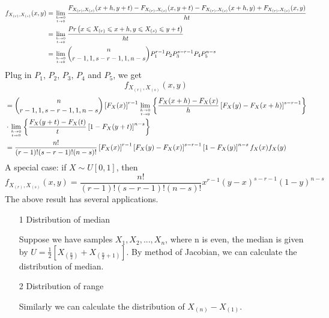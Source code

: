 \documentclass[twoside]{article}
\begin{document}
	\begin{align*}
		f_{X_{(r)}, X_{(s)}}(x,y) &= \lim\limits_{h\to 0 \atop t\to 0} \frac{F_{X_{(r)}, X_{(s)}}(x+h, y+t) - F_{X_{(r)}, X_{(s)}}(x, y+t) - F_{X_{(r)}, X_{(s)}}(x+h, y) + F_{X_{(r)}, X_{(s)}}(x, y)}{ht} \\
		&= \lim\limits_{h\to 0 \atop t\to 0} \frac{Pr \left( x \leqslant X_{(r)} \leqslant x+h, y \leqslant X_{(s)} \leqslant y+t \right)}{ht} \\
		&= \lim\limits_{h\to 0 \atop t\to 0} \binom{n}{r-1, 1, s-r-1, 1, n-s} P_1^{r-1} P_2 P_3^{s-r-1} P_4 P_5^{n-s}
	\end{align*}
	Plug in $P_1$, $P_2$, $P_3$, $P_4$ and $P_5$, we get
	$$
	f_{X_{(r)}, X_{(s)}} (x,y)
	$$
	\begin{align*}
		&= \binom{n}{r-1, 1, s-r-1, 1, n-s} \left[ F_X (x) \right]^{r-1} \lim\limits_{h\to 0 \atop t\to 0} \left\{ \frac{F_X(x+h) - F_X(x)}{h} \left[ F_X(y) - F_X(x+h) \right]^{s-r-1} \right\} \\
		&\cdot \lim\limits_{h\to 0 \atop t\to 0} \left\{ \frac{F_X(y+t) - F_X(t)}{t} \left[ 1 - F_X (y+t) \right]^{n-s} \right\} \\
		&= \frac{n!}{(r-1)!(s-r-1)!(n-s)!} \left[ F_X (x) \right]^{r-1} \left[ F_X(y) - F_X(x) \right]^{s-r-1} \left[ 1 - F_X(y) \right]^{n-s} f_X(x) f_X(y)
	\end{align*}
	A special case: if $X \sim U[0,1]$, then 
	$$
	f_{X_{(r)}, X_{(s)}}(x,y) = \frac{n!}{(r-1)!(s-r-1)!(n-s)!} x^{r-1} (y-x)^{s-r-1} (1-y)^{n-s}
	$$
	The above result has several applications. 
	\begin{itemize}
		\item[1] Distribution of median
		
		Suppose we have samples $X_1, X_2, ..., X_n$, where n is even, the median is given by $U = \frac{1}{2} \left[ X_{(\frac{n}{2})} + X_{(\frac{n}{2}+1)} \right]$. By method of Jacobian, we can calculate the distribution of median. 
		\item[2] Distribution of range
		
		Similarly we can calculate the distribution of $X_{(n)} - X_{(1)}$.
	\end{itemize}
\end{document}
